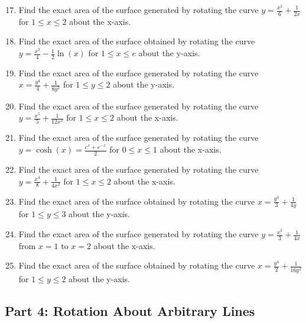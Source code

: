 \documentclass[12pt]{article}
\begin{document}
\begin{enumerate}
    \setcounter{enumi}{16}
    \item Find the exact area of the surface generated by rotating the curve $y = \frac{x^3}{6} + \frac{1}{2x}$ for $1 \le x \le 2$ about the x-axis.
    
    \item Find the exact area of the surface obtained by rotating the curve $y = \frac{x^2}{4} - \frac{1}{2}\ln(x)$ for $1 \le x \le e$ about the y-axis.
    
    \item Find the exact area of the surface generated by rotating the curve $x = \frac{y^4}{4} + \frac{1}{8y^2}$ for $1 \le y \le 2$ about the y-axis.

    \item Find the exact area of the surface generated by rotating the curve $y = \frac{x^5}{5} + \frac{1}{12x^3}$ for $1 \le x \le 2$ about the x-axis.
    
    \item Find the exact area of the surface generated by rotating the curve $y=\cosh(x) = \frac{e^x+e^{-x}}{2}$ for $0 \le x \le 1$ about the x-axis.
    
    \item Find the exact area of the surface generated by rotating the curve $y = \frac{x^4}{8} + \frac{1}{4x^2}$ for $1 \le x \le 2$ about the x-axis.
    
    \item Find the exact area of the surface obtained by rotating the curve $x = \frac{y^3}{3} + \frac{1}{4y}$ for $1 \le y \le 3$ about the y-axis.
    
    \item Find the exact area of the surface generated by rotating the curve $y=\frac{x^3}{3} + \frac{1}{4x}$ from $x=1$ to $x=2$ about the x-axis.
    
    \item Find the exact area of the surface obtained by rotating the curve $x = \frac{y^4}{2} + \frac{1}{16y^2}$ for $1 \le y \le 2$ about the y-axis.
\end{enumerate}

\subsection*{Part 4: Rotation About Arbitrary Lines}
\end{document}
